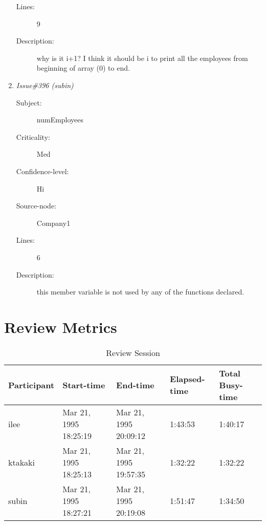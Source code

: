 \begin{enumerate}
\begin{description}
\item [Lines:] 9

\item [Description:] why is it i+1? I think it should be i to print
all the employees from beginning of array (0) to end.
\end{description}
\item {\it Issue\#396 (subin)}
\begin{description}
\item [Subject:] numEmployees
\item [Criticality:] Med
\item [Confidence-level:] Hi
\item [Source-node:] Company1

\item [Lines:] 6

\item [Description:] this member variable is not used by any of the
functions declared.
\end{description}
\end{enumerate}
\section{Review Metrics}
\begin{table}[hb]
\begin{center}
\begin{tabular}{|l|l|l|l|l|}
\hline
Participant & Start-time & End-time & Elapsed-time & Total Busy-time \\
\hline
ilee & Mar 21, 1995 18:25:19 & Mar 21, 1995 20:09:12 & 1:43:53 & 1:40:17 \\
ktakaki & Mar 21, 1995 18:25:13 & Mar 21, 1995 19:57:35 & 1:32:22 & 1:32:22 \\
subin & Mar 21, 1995 18:27:21 & Mar 21, 1995 20:19:08 & 1:51:47 & 1:34:50 \\
\hline
\end{tabular}
\end{center}
\caption{Review Session}
\end{table}


